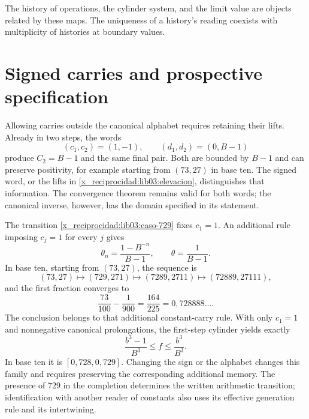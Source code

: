 The history of operations, the cylinder system, and the limit value are
objects related by these maps. The uniqueness of a
history's reading coexists with multiplicity of histories at
boundary values.

\section{Signed carries and prospective specification}
\label{x_reciprocidad:lib03:firmados}

Allowing carries outside the canonical alphabet requires retaining their
lifts. Already in two steps, the words
\[
 (c_1,c_2)=(1,-1),\qquad(d_1,d_2)=(0,B-1)
\]
produce \(C_2=B-1\) and the same final pair. Both are bounded by
\(B-1\) and can preserve positivity, for example starting from
\((73,27)\) in base ten. The signed word, or the lifts in
\eqref{x_reciprocidad:lib03:elevacion}, distinguishes that information. The convergence
theorem remains valid for both words; the canonical inverse,
however, has the domain specified in its statement.

The transition \eqref{x_reciprocidad:lib03:caso-729} fixes \(c_1=1\). An additional
rule imposing \(c_j=1\) for every \(j\) gives
\begin{equation}
 \theta_n=\frac{1-B^{-n}}{B-1},\qquad
 \theta=\frac1{B-1}.
 \label{x_reciprocidad:lib03:acarreo-constante}
\end{equation}
In base ten, starting from \((73,27)\), the sequence is
\[
 (73,27)\longmapsto(729,271)\longmapsto(7289,2711)
 \longmapsto(72889,27111),
\]
and the first fraction converges to
\begin{equation}
 \frac{73}{100}-\frac1{900}=\frac{164}{225}
 =0{,}728888\ldots.
 \label{x_reciprocidad:lib03:limite-constante}
\end{equation}
The conclusion belongs to that additional constant-carry rule.
With only \(c_1=1\) and nonnegative canonical prolongations, the
first-step cylinder yields exactly
\begin{equation}
 \frac{b^3-1}{B^3}\leq f\leq\frac{b^3}{B^3}.
 \label{x_reciprocidad:lib03:primer-cilindro}
\end{equation}
In base ten it is \([0{,}728,0{,}729]\). Changing the sign or the alphabet
changes this family and requires preserving the corresponding
additional memory. The presence of \(729\) in the completion determines
the written arithmetic transition; identification with another reader of
constants also uses its effective generation rule and its
intertwining.


